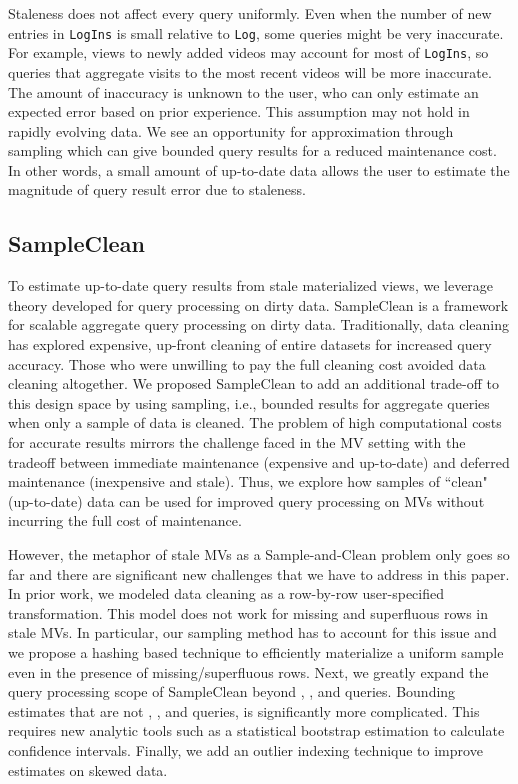 Staleness does not affect every query uniformly.
Even when the number of new entries in \texttt{LogIns} is small relative to \texttt{Log}, some queries might be very inaccurate.
For example, views to newly added videos may account for most of \texttt{LogIns}, so queries that aggregate visits to the most recent videos will be more inaccurate.
The amount of inaccuracy is unknown to the user, who can only estimate an expected error based on prior experience.
This assumption may not hold in rapidly evolving data.
We see an opportunity for approximation through sampling which can give bounded query results for a reduced maintenance cost.
In other words, a small amount of up-to-date data allows the user to estimate the magnitude of query result error due to staleness.

\subsection{SampleClean~\cite{wang1999sample}}
To estimate up-to-date query results from stale materialized views, we leverage theory developed for query processing on dirty data.
SampleClean is a framework for scalable aggregate query processing on dirty data.
Traditionally, data cleaning has explored expensive, up-front cleaning of entire datasets for increased query accuracy.
Those who were unwilling to pay the full cleaning cost avoided data cleaning altogether.
We proposed SampleClean to add an additional trade-off to this design space by using sampling, i.e., bounded results for aggregate queries when only a sample of data is cleaned.
The problem of high computational costs for accurate results mirrors the challenge faced in the MV setting with the tradeoff between immediate maintenance (expensive and up-to-date) and deferred maintenance (inexpensive and stale). 
Thus, we explore how samples of ``clean" (up-to-date) data can be used for improved query processing on MVs without incurring the full cost of maintenance.

However, the metaphor of stale MVs as a Sample-and-Clean problem only goes so far and there are significant new challenges that we have to address in this paper.
In prior work, we modeled data cleaning as a row-by-row user-specified transformation.
This model does not work for missing and superfluous rows in stale MVs.
In particular, our sampling method has to account for this issue and we propose a hashing based technique to efficiently materialize a uniform sample even in the presence of missing/superfluous rows.
Next, we greatly expand the query processing scope of SampleClean beyond \sumfunc, \countfunc, and \avgfunc queries.
Bounding estimates that are not \sumfunc, \countfunc, and \avgfunc queries, is significantly more complicated.
This requires new analytic tools such as a statistical bootstrap estimation to calculate confidence intervals.
Finally, we add an outlier indexing technique to improve estimates on skewed data.


